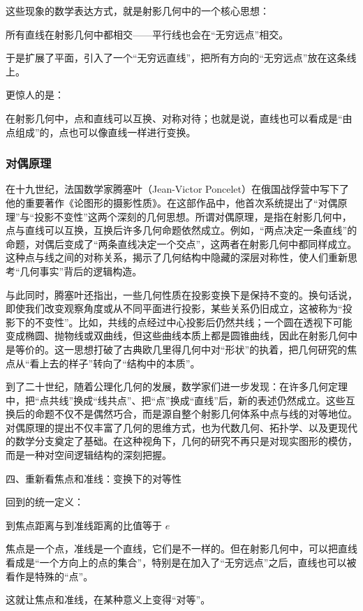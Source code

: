 这些现象的数学表达方式，就是射影几何中的一个核心思想：

所有直线在射影几何中都相交——平行线也会在“无穷远点”相交。

于是扩展了平面，引入了一个“无穷远直线”，把所有方向的“无穷远点”放在这条线上。

更惊人的是：

在射影几何中，点和直线可以互换、对称对待；也就是说，直线也可以看成是“由点组成”的，点也可以像直线一样进行变换。

\subsubsection{对偶原理}

在十九世纪，法国数学家腾塞叶（Jean-Victor Poncelet）在俄国战俘营中写下了他的重要著作《论图形的摄影性质》。在这部作品中，他首次系统提出了“对偶原理”与“投影不变性”这两个深刻的几何思想。所谓对偶原理，是指在射影几何中，点与直线可以互换，互换后许多几何命题依然成立。例如，“两点决定一条直线”的命题，对偶后变成了“两条直线决定一个交点”，这两者在射影几何中都同样成立。这种点与线之间的对称关系，揭示了几何结构中隐藏的深层对称性，使人们重新思考“几何事实”背后的逻辑构造。

与此同时，腾塞叶还指出，一些几何性质在投影变换下是保持不变的。换句话说，即使我们改变观察角度或从不同平面进行投影，某些关系仍旧成立，这被称为“投影下的不变性”。比如，共线的点经过中心投影后仍然共线；一个圆在透视下可能变成椭圆、抛物线或双曲线，但这些曲线本质上都是圆锥曲线，因此在射影几何中是等价的。这一思想打破了古典欧几里得几何中对“形状”的执着，把几何研究的焦点从“看上去的样子”转向了“结构中的本质”。

到了二十世纪，随着公理化几何的发展，数学家们进一步发现：在许多几何定理中，把“点共线”换成“线共点”、把“点”换成“直线”后，新的表述仍然成立。这些互换后的命题不仅不是偶然巧合，而是源自整个射影几何体系中点与线的对等地位。对偶原理的提出不仅丰富了几何的思维方式，也为代数几何、拓扑学、以及更现代的数学分支奠定了基础。在这种视角下，几何的研究不再只是对现实图形的模仿，而是一种对空间逻辑结构的深刻把握。


四、重新看焦点和准线：变换下的对等性

回到的统一定义：

到焦点距离与到准线距离的比值等于 $e$

焦点是一个点，准线是一个直线，它们是不一样的。但在射影几何中，可以把直线看成是“一个方向上的点的集合”，特别是在加入了“无穷远点”之后，直线也可以被看作是特殊的“点”。

这就让焦点和准线，在某种意义上变得“对等”。

